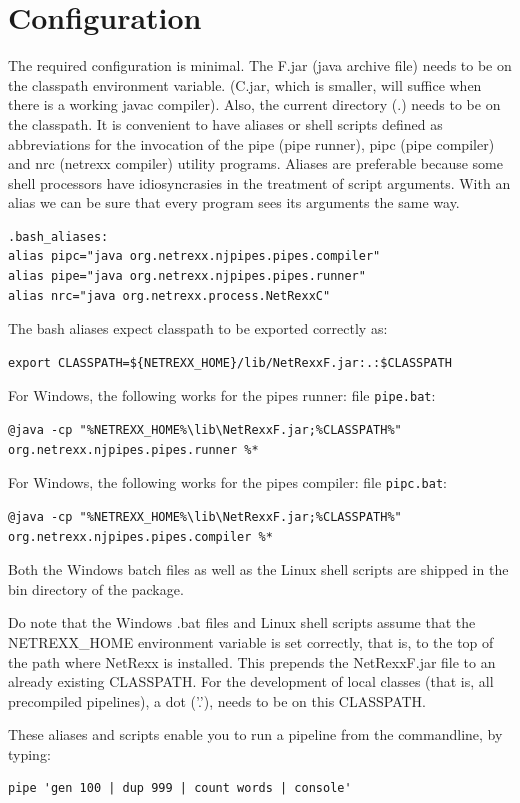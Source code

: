\section{Configuration}
The required configuration is minimal. The \nr{}F.jar (java archive
file) needs to be on the classpath environment variable. (\nr{}C.jar, which is smaller, will suffice when there is a
working javac compiler).
Also, the current directory (.) needs to be on the classpath.
It is convenient to have aliases or shell scripts defined as abbreviations for the invocation of the pipe (pipe runner),
pipc (pipe compiler) and nrc (netrexx compiler) utility programs.
Aliases are preferable because some shell processors have
idiosyncrasies in the treatment of script arguments. With an alias we
can be sure that every \nr{} program sees its arguments the same
way.
\begin{lstlisting}
.bash_aliases:
alias pipc="java org.netrexx.njpipes.pipes.compiler"
alias pipe="java org.netrexx.njpipes.pipes.runner"
alias nrc="java org.netrexx.process.NetRexxC"
\end{lstlisting}
The bash aliases expect classpath to be exported correctly as:
\begin{lstlisting}
export CLASSPATH=${NETREXX_HOME}/lib/NetRexxF.jar:.:$CLASSPATH
\end{lstlisting}

For Windows, the following works for the pipes runner: file \texttt{pipe.bat}:
\begin{lstlisting}
@java -cp "%NETREXX_HOME%\lib\NetRexxF.jar;%CLASSPATH%" org.netrexx.njpipes.pipes.runner %*
\end{lstlisting}
For Windows, the following works for the pipes compiler: file \texttt{pipc.bat}:
\begin{lstlisting}
@java -cp "%NETREXX_HOME%\lib\NetRexxF.jar;%CLASSPATH%" org.netrexx.njpipes.pipes.compiler %*
\end{lstlisting}
Both the Windows batch files as well as the Linux shell scripts are shipped in the bin directory of the \nr{} package.
\begin{shaded}
  Do note that the Windows .bat files and Linux shell scripts assume that the NETREXX\_HOME
environment variable is set correctly, that is, to the top of the path
where NetRexx is installed. This prepends the NetRexxF.jar file to an
already existing CLASSPATH. For the development of local classes (that is, all precompiled pipelines), a
dot ('.'), needs to be on this CLASSPATH.
\end{shaded}
These aliases and scripts enable you to run a pipeline from the commandline, by typing:
\begin{lstlisting}
pipe 'gen 100 | dup 999 | count words | console'
\end{lstlisting}


